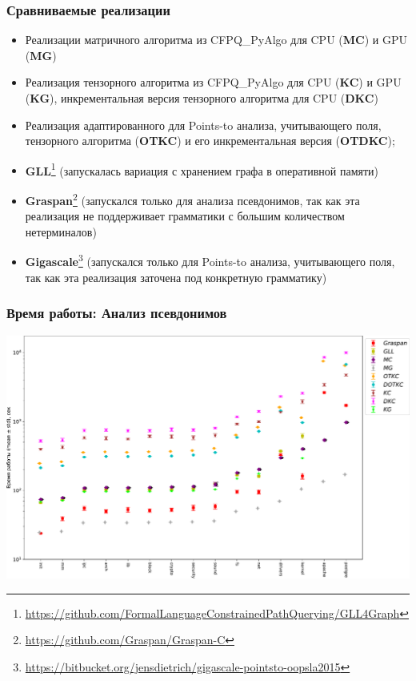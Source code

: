\documentclass[x11names,dvipsnames,table,aspectratio=169]{beamer}
\begin{document}
\begin{frame}
  \transwipe[direction=90]
  \frametitle{Сравниваемые реализации}
  
  \begin{itemize}
    \item Реализации матричного алгоритма из CFPQ\_PyAlgo для CPU (\textbf{MC}) и GPU (\textbf{MG})
    \item Реализация тензорного алгоритма из CFPQ\_PyAlgo для CPU (\textbf{KC}) и GPU (\textbf{KG}), инкрементальная версия тензорного алгоритма для CPU (\textbf{DKC})
    \item Реализация адаптированного для Points-to анализа, учитывающего поля, тензорного алгоритма (\textbf{OTKC}) и его инкрементальная версия (\textbf{OTDKC});
    \item \textbf{GLL}\footnote{\url{https://github.com/FormalLanguageConstrainedPathQuerying/GLL4Graph}} (запускалась вариация с хранением графа в оперативной памяти)
    \item \textbf{Graspan}\footnote{\url{https://github.com/Graspan/Graspan-C}} (запускался только для анализа псевдонимов, так как эта реализация не поддерживает грамматики с большим количеством нетерминалов)
    \item \textbf{Gigascale}\footnote{\url{https://bitbucket.org/jensdietrich/gigascale-pointsto-oopsla2015}} (запускался только для Points-to анализа, учитывающего поля, так как эта реализация заточена под конкретную грамматику)
  \end{itemize}

\end{frame}


\begin{frame}
  \transwipe[direction=90]
  \frametitle{Время работы: Анализ псевдонимов}

  \begin{center}
      \includegraphics[height=.85\textheight]{pictures/ma_time.pdf}
  \end{center}

\end{frame}
\end{document}
